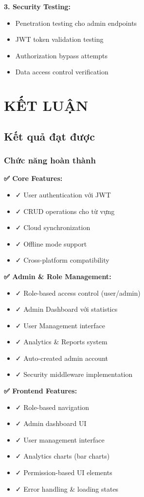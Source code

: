 \documentclass[12pt,a4paper]{article}
\begin{document}
\textbf{3. Security Testing:}
\begin{itemize}
    \item Penetration testing cho admin endpoints
    \item JWT token validation testing
    \item Authorization bypass attempts
    \item Data access control verification
\end{itemize}

\section{KẾT LUẬN}

\subsection{Kết quả đạt được}

\subsubsection{Chức năng hoàn thành}

\textbf{✅ Core Features:}
\begin{itemize}
    \item ✓ User authentication với JWT
    \item ✓ CRUD operations cho từ vựng
    \item ✓ Cloud synchronization
    \item ✓ Offline mode support
    \item ✓ Cross-platform compatibility
\end{itemize}

\textbf{✅ Admin \& Role Management:}
\begin{itemize}
    \item ✓ Role-based access control (user/admin)
    \item ✓ Admin Dashboard với statistics
    \item ✓ User Management interface
    \item ✓ Analytics \& Reports system
    \item ✓ Auto-created admin account
    \item ✓ Security middleware implementation
\end{itemize}

\textbf{✅ Frontend Features:}
\begin{itemize}
    \item ✓ Role-based navigation
    \item ✓ Admin dashboard UI
    \item ✓ User management interface
    \item ✓ Analytics charts (bar charts)
    \item ✓ Permission-based UI elements
    \item ✓ Error handling \& loading states
\end{itemize}
\end{document}
